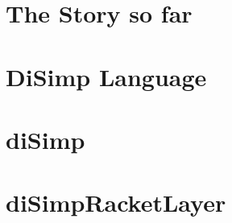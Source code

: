 \documentclass[a4paper,openany]{amsbook}
\begin{document}
\chapter{The Story so far}


\chapter{DiSimp Language}


\appendix
\chapter{diSimp}


\chapter{diSimpRacketLayer}



\printbibliography
\end{document}
